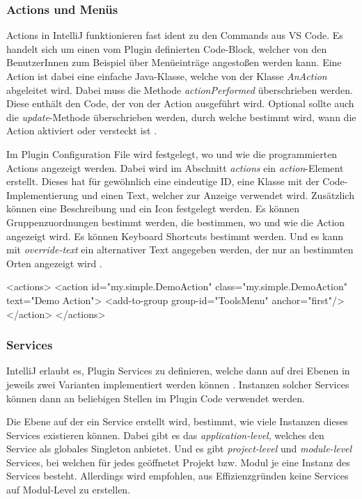 \subsubsection{Actions und Menüs}
  Actions in IntelliJ funktionieren fast ident zu den Commands aus VS Code. Es handelt sich um
  einen vom Plugin definierten Code-Block, welcher von den BenutzerInnen zum Beispiel über Menüeinträge
  angestoßen werden kann. Eine Action ist dabei eine einfache Java-Klasse, welche von der Klasse \emph{AnAction}
  abgeleitet wird. Dabei muss die Methode \emph{actionPerformed} überschrieben werden. Diese 
  enthält den Code, der von der Action ausgeführt wird. Optional sollte auch die
  \emph{update}-Methode überschrieben werden, durch welche bestimmt wird, wann die Action 
  aktiviert oder versteckt ist \cite{IntelliJPlatformSDKActions,IntelliJPlatformSDKActionSystem}.

  Im Plugin Configuration File wird festgelegt, wo und wie die programmierten Actions angezeigt
  werden. Dabei wird im Abschnitt \emph{actions} ein \emph{action}-Element erstellt.
  Dieses hat für gewöhnlich eine eindeutige ID, eine Klasse mit der Code-Implementierung und
  einen Text, welcher zur Anzeige verwendet wird. Zusätzlich können eine Beschreibung und
  ein Icon festgelegt werden. Es können Gruppenzuordnungen bestimmt werden, die bestimmen,
  wo und wie die Action angezeigt wird. Es können Keyboard Shortcuts bestimmt werden. Und
  es kann mit \emph{override-text} ein alternativer Text angegeben werden, der nur an
  bestimmten Orten angezeigt wird \cite{IntelliJPlatformSDKConfigurationActions}.
  
\begin{XmlCode}
    <actions>
        <action id="my.simple.DemoAction"
                class="my.simple.DemoAction" 
                text="Demo Action">
            <add-to-group group-id="ToolsMenu" anchor="first"/>
        </action>
    </actions>
\end{XmlCode}

\subsubsection{Services}
  IntelliJ erlaubt es, Plugin Services zu definieren, welche dann auf drei Ebenen
  in jeweils zwei Varianten implementiert werden können \cite{IntelliJPlatformSDKServices}. 
  Instanzen solcher Services können dann an beliebigen Stellen im Plugin Code verwendet werden.

  Die Ebene auf der ein Service erstellt wird, bestimmt, wie viele Instanzen dieses 
  Services existieren können. Dabei gibt es das \emph{application-level}, welches den Service
  als globales Singleton %
  anbietet. Und es gibt \emph{project-level} und \emph{module-level} Services, bei welchen
  für jedes geöffnetet Projekt bzw. Modul je eine Instanz des Services besteht. Allerdings 
  wird empfohlen, aus Effizienzgründen keine Services auf Modul-Level zu erstellen.
  
